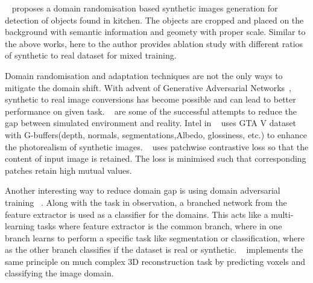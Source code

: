 ~\cite{georgakis2017synthesizing} proposes a domain randomisation based synthetic images generation for detection of objects found in kitchen.
The objects are cropped and placed on the background with semantic information and geomety with proper scale.
Similar to the above works, here to the author provides ablation study with different ratios of synthetic to real dataset for mixed training.

Domain randomisation and adaptation techniques are not the only ways to mitigate the domain shift.
With advent of Generative Adversarial Networks~\cite{Goodfellow2014GenerativeAN}, synthetic to real image conversions has become possible and can lead to better performance on given task.
~\cite{Richter_2021, CycleGAN2017, park2020cut,isola2017image, dundar2018domain,Wang2018HighResolutionIS} are some of the successful attempts to reduce the gap between simulated environment and reality.
Intel in ~\cite{Richter_2021} uses GTA V dataset with G-buffers(depth, normals, segmentations,Albedo, glossiness, etc.) to enhance the photorealism of synthetic images.
~\cite{park2020cut} uses patchwise contrastive loss so that the content of input image is retained.
The loss is minimised such that corresponding patches retain high mutual values.

Another interesting way to reduce domain gap is using domain adversarial training ~\cite{ganin2016domainadversarial}.
Along with the task in observation, a branched network from the feature extractor is used as a classifier for the domains.
This acts like a multi-learning tasks where feature extractor is the common branch, where in one branch learns to perform a specific task like segmentation or classification, where as the other branch classifies if the dataset is real or synthetic.
~\cite{pinheiro2019domainadaptive} implements the same principle on much complex 3D reconstruction task by predicting voxels and classifying the image domain.

